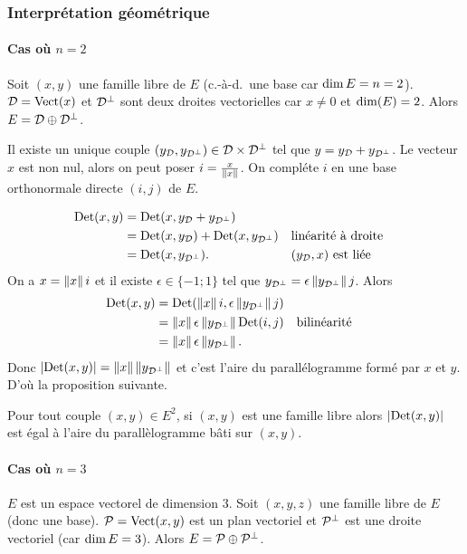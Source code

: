 \subsubsection{Interprétation géométrique}

\paragraph{Cas où $n=2$}

Soit $(x,y)$ une famille libre de $E$ (c.-à-d.\ une base car $\Dim E=n=2$). $\Dr=\VectEngendre(x)$ et $\Dr^\perp$ sont deux droites vectorielles car $x\neq 0$ et $\Dim(E)=2$. Alors $E = \Dr \oplus \Dr^\perp$.

Il existe un unique couple $(y_\Dr, y_{\Dr^\perp}) \in \Dr \times \Dr^\perp$ tel que $y=y_\Dr +y_{\Dr^\perp}$. Le vecteur $x$ est non nul, alors on peut poser $i=\frac{x}{\norme{x}}$. On compléte $i$ en une base orthonormale directe $(i,j)$ de $E$.

\begin{align}
  \Det(x,y) &= \Det(x,y_\Dr +y_{\Dr^\perp}) \\
  &=\Det(x,y_\Dr) + \Det(x,y_{\Dr^\perp}) && \text{linéarité à droite} \\
  &=\Det(x,y_{\Dr^\perp}). && (y_\Dr,x) \text{~est liée}
\end{align}
On a $x=\norme{x}i$ et il existe $\epsilon \in \{-1;1\}$ tel que $y_{\Dr^\perp}=\epsilon\norme{y_{\Dr^\perp}}j$. Alors
\begin{align}
  \Det(x,y) &=\Det(\norme{x}i, \epsilon\norme{y_{\Dr^\perp}}j) \\
  &=\norme{x} \epsilon\norme{y_{\Dr^\perp}} \Det(i,j) && \text{bilinéarité} \\
  &=\norme{x} \epsilon\norme{y_{\Dr^\perp}}.
\end{align}
Donc $\abs{\Det(x,y)}=\norme{x}\norme{y_{\Dr^\perp}}$ et c'est l'aire du parallélogramme formé par $x$ et $y$. D'où la proposition suivante.

\begin{prop}
  Pour tout couple $(x,y) \in E^2$, si $(x,y)$ est une famille libre alors $\abs{\Det(x,y)}$ est égal à l'aire du parallèlogramme bâti sur $(x,y)$.
\end{prop}

\paragraph{Cas où $n=3$}

$E$ est un espace vectorel de dimension 3. Soit $(x,y,z)$ une famille libre de $E$ (donc une base). $\P=\VectEngendre(x,y)$ est un plan vectoriel et $\P^\perp$ est une droite vectoriel (car $\Dim E=3$). Alors $E =\P \oplus\P^\perp$.

